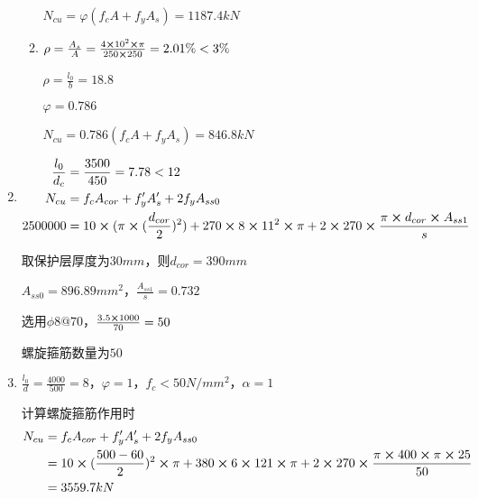 \documentclass{article}
\begin{document}
\begin{questionList}
\begin{enumerate}
\begin{enumerate}
                              \par $N_{cu}=\varphi(f_cA+f_yA_s)=1187.4kN$
                        \item $\rho=\frac{A_s}{A}=\frac{4\cross10^2\cross\pi}{250\cross250}=2.01\%<3\%$
                              \par $\rho=\frac{l_0}{b}=18.8$
                              \par $\varphi=0.786$
                              \par $N_{cu}=0.786(f_cA+f_yA_s)=846.8kN$
                  \end{enumerate}
            \item \begin{align*}
                        \frac{l_0}{d_c} & =\frac{3500}{450}=7.78<12                                                                                                         \\
                        N_{cu}          & =f_cA_{cor}+f_y^{\prime}A_s^{\prime}+2f_yA_{ss0}                                                                                  \\
                        2500000         & =10\cross(\pi\cross(\frac{d_{cor}}{2})^2)+270\cross8\cross11^2\cross\pi+2\cross270\cross\frac{\pi\cross d_{cor}\cross A_{ss1}}{s}
                  \end{align*}
                  \par 取保护层厚度为$30mm$，则$d_{cor}=390mm$
                  \par $A_{ss0}=896.89mm^2$，$\frac{A_{ss1}}{s}=0.732$
                  \par 选用$\phi8@70$，$\frac{3.5\cross1000}{70}=50$
                  \par 螺旋箍筋数量为$50$
            \item $\frac{l_0}{d}=\frac{4000}{500}=8$，$\varphi=1$，$f_c<50N/mm^2$，$\alpha=1$
                  \par 计算螺旋箍筋作用时\begin{align*}
                        N_{cu} & =f_cA_{cor}+f_y^{\prime}A_s^{\prime}+2f_yA_{ss0}                                                                             \\
                               & =10\cross(\frac{500-60}{2})^2\cross\pi+380\cross6\cross121\cross\pi+2\cross270\cross\frac{\pi\cross400\cross\pi\cross25}{50} \\
                               & =3559.7kN
                  \end{align*}

\end{enumerate}
\end{questionList}
\end{document}
